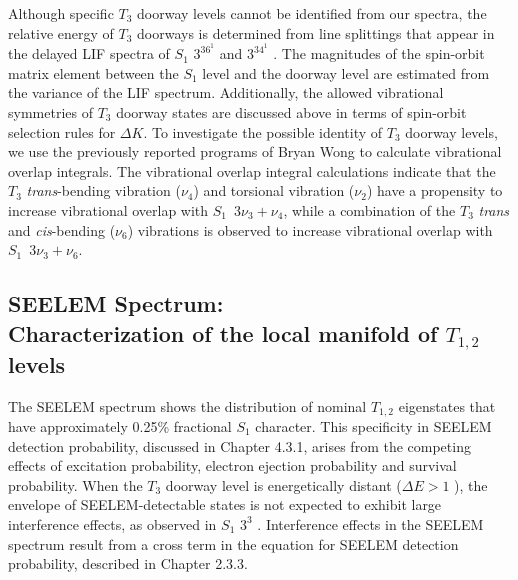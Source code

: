 Although specific $T_3$ doorway levels cannot be identified from our
spectra, the relative energy of $T_3$ doorways is determined from line
splittings that appear in the delayed LIF spectra of $S_1$ $3^36^1$
 and $3^34^1$ .  The magnitudes of the spin-orbit matrix
element between the $S_1$ level and the doorway level are estimated
from the variance of the LIF spectrum.  Additionally, the allowed
vibrational symmetries of $T_3$ doorway states are discussed above in
terms of spin-orbit selection rules for $\Delta K$.  To investigate
the possible identity of $T_3$ doorway levels, we use the previously
reported programs of Bryan Wong to calculate vibrational overlap
integrals.  The vibrational overlap integral calculations indicate
that the $T_3$ \emph{trans}-bending vibration ($\nu_4$) and torsional
vibration ($\nu_2$) have a propensity to increase vibrational overlap
with $S_1 \:\; 3\nu_3 + \nu_4$, while a combination of the $T_3$
\emph{trans} and \emph{cis}-bending ($\nu_6$) vibrations is observed
to increase vibrational overlap with $S_1 \:\; 3\nu_3 + \nu_6$.

























\subsection{SEELEM Spectrum: \\Characterization of the local manifold of
  $T_{1,2}$ levels}

The SEELEM spectrum shows the distribution of nominal $T_{1,2}$
eigenstates that have approximately 0.25\% fractional $S_1$ character.
This specificity in SEELEM detection probability, discussed in Chapter
4.3.1, arises from the competing effects of excitation probability,
electron ejection probability and survival probability.  When the
$T_3$ doorway level is energetically distant ($\Delta E > 1$ \rcm),
the envelope of SEELEM-detectable states is not expected to exhibit
large interference effects, as observed in $S_1$ $3^3$ .
Interference effects in the SEELEM spectrum result from a cross term
in the equation for SEELEM detection probability, described in Chapter
2.3.3.

